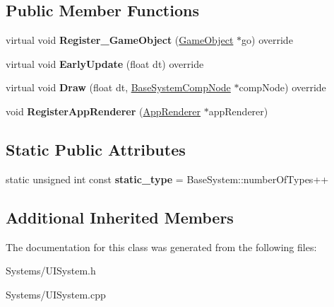 \subsection*{Public Member Functions}
\begin{DoxyCompactItemize}
\item 
\mbox{\label{classUISystem_a24d58ab299fd47c10948230793ff135c}} 
virtual void {\bfseries Register\+\_\+\+Game\+Object} (\hyperlink{classGameObject}{Game\+Object} $\ast$go) override
\item 
\mbox{\label{classUISystem_ac7e49ca17db397a2321a8b89dbc5bd47}} 
virtual void {\bfseries Early\+Update} (float dt) override
\item 
\mbox{\label{classUISystem_a898a6c2d363122cc62cfdb1516b2f792}} 
virtual void {\bfseries Draw} (float dt, \hyperlink{structBaseSystemCompNode}{Base\+System\+Comp\+Node} $\ast$comp\+Node) override
\item 
\mbox{\label{classUISystem_a1b42bb2b9d953c402826eb9aa93cbed5}} 
void {\bfseries Register\+App\+Renderer} (\hyperlink{classAppRenderer}{App\+Renderer} $\ast$app\+Renderer)
\end{DoxyCompactItemize}
\subsection*{Static Public Attributes}
\begin{DoxyCompactItemize}
\item 
\mbox{\label{classUISystem_acd7560147af6e4ff8393309b0e7ac0aa}} 
static unsigned int const {\bfseries static\+\_\+type} = Base\+System\+::number\+Of\+Types++
\end{DoxyCompactItemize}
\subsection*{Additional Inherited Members}


The documentation for this class was generated from the following files\+:\begin{DoxyCompactItemize}
\item 
Systems/U\+I\+System.\+h\item 
Systems/U\+I\+System.\+cpp\end{DoxyCompactItemize}
